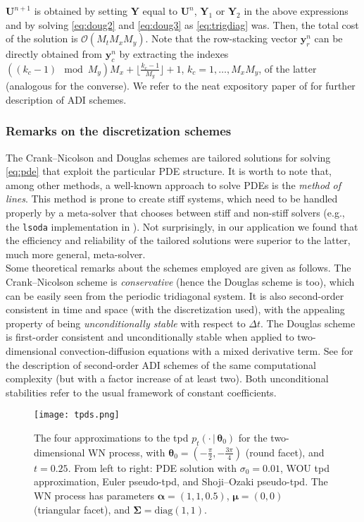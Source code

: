 \documentclass[oneside,11pt]{article}
\newcommand{\lp}{\left(}
\newcommand{\rp}{\right)}
\newcommand{\by}{\mathbf{y}}
\newcommand{\bY}{\mathbf{Y}}
\newcommand{\bU}{\mathbf{U}}
\newcommand{\bmu}{\boldsymbol\mu}
\newcommand{\ba}{\boldsymbol\alpha}
\newcommand{\btheta}{\boldsymbol\theta}
\newcommand{\bSigma}{\boldsymbol\Sigma}
\newcommand{\diag}[1]{\mathrm{diag}\lp #1\rp}
\newcommand{\Order}[1]{\mathcal{O}\lp#1\rp}
\begin{document}
$\bU^{n+1}$ is obtained by setting $\bY$ equal to $\bU^n$, $\bY_1$ or $\bY_2$ in the above expressions and by solving \eqref{eq:doug2} and \eqref{eq:doug3} as \eqref{eq:trigdiag} was. Then, the total cost of the solution is $\Order{{M_t}M_xM_y}$. Note that the row-stacking vector $\by_r^n$ can be directly obtained from $\by_c^n$ by extracting the indexes $((k_c-1)\mod M_y)M_x+\big\lfloor\frac{k_c - 1}{M_y}\big\rfloor+1$, $k_c=1,\ldots,\allowbreak M_xM_y$, of the latter (analogous for the converse). We refer to the neat expository paper of \cite{IntHout2010} for further description of ADI schemes.

\subsubsection{Remarks on the discretization schemes}

The Crank--Nicolson and Douglas schemes are tailored solutions for solving \eqref{eq:pde} that exploit the particular PDE structure. It is worth to note that, among other methods, a well-known approach to solve PDEs is the \textit{method of lines}. This method is prone to create stiff systems, which need to be handled properly by a meta-solver that chooses between stiff and non-stiff solvers (e.g., the \texttt{lsoda} implementation in \cite{Soetaert2012}). Not surprisingly, in our application we found that the efficiency and reliability of the tailored solutions were superior to the latter, much more general, meta-solver. \\

Some theoretical remarks about the schemes employed are given as follows. The Crank--Nicolson scheme is \textit{conservative} (hence the Douglas scheme is too), which can be easily seen from the periodic tridiagonal system. It is also second-order consistent in time and space (with the discretization used), with the appealing property of being \textit{unconditionally stable} with respect to $\Delta t$. The Douglas scheme is first-order consistent and unconditionally stable when applied to two-dimensional convection-diffusion equations with a mixed derivative term. See \cite{IntHout2010} for the description of second-order ADI schemes of the same computational complexity (but with a factor increase of at least two). Both unconditional stabilities refer to the usual framework of constant coefficients.

\begin{figure}[H]
\centering
\texttt{[image: tpds.png]}
\caption{\small The four approximations to the tpd $p_t(\cdot\,|\,\btheta_0)$ for the two-dimensional WN process, with $\btheta_0=(-\frac{\pi}{2}, -\frac{3\pi}{4})$ (round facet), and $t=0.25$. From left to right: PDE solution with $\sigma_0=0.01$, WOU tpd approximation, Euler pseudo-tpd, and Shoji--Ozaki pseudo-tpd. The WN process has parameters $\ba=(1,1,0.5)$,  $\bmu=(0,0)$ (triangular facet), and $\bSigma=\diag{1, 1}$.\label{fig:tpds}}
\end{figure}
\end{document}
